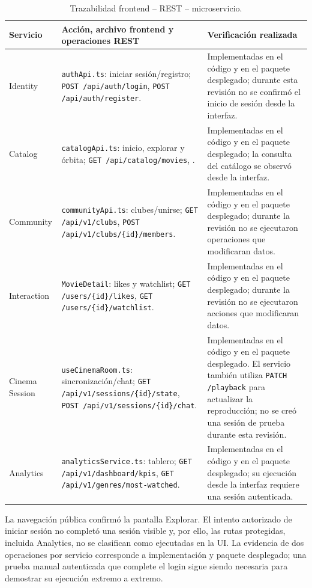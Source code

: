 \begin{table}[H]\centering\small\renewcommand{\arraystretch}{1.22}
\caption{Trazabilidad frontend -- REST -- microservicio.}\label{tab:frontend-servicios}
\begin{tabularx}{\textwidth}{p{}p{}Y}
\toprule Servicio & Acción, archivo frontend y operaciones REST & Verificación realizada \\\midrule
Identity & \texttt{authApi.ts}: iniciar sesión/registro; \texttt{POST /api/auth/login}, \texttt{POST /api/auth/register}. & Implementadas en el código y en el paquete desplegado; durante esta revisión no se confirmó el inicio de sesión desde la interfaz. \\
Catalog & \texttt{catalogApi.ts}: inicio, explorar y órbita; \texttt{GET /api/catalog/movies}, . & Implementadas en el código y en el paquete desplegado; la consulta del catálogo se observó desde la interfaz. \\
Community & \texttt{communityApi.ts}: clubes/unirse; \texttt{GET /api/v1/clubs}, \texttt{POST /api/v1/clubs/\{id\}/members}. & Implementadas en el código y en el paquete desplegado; durante la revisión no se ejecutaron operaciones que modificaran datos. \\
Interaction & \texttt{MovieDetail}: likes y watchlist; \texttt{GET /users/\{id\}/likes}, \texttt{GET /users/\{id\}/watchlist}. & Implementadas en el código y en el paquete desplegado; durante la revisión no se ejecutaron acciones que modificaran datos. \\
Cinema Session & \texttt{useCinemaRoom.ts}: sincronización/chat; \texttt{GET /api/v1/sessions/\{id\}/state}, \texttt{POST /api/v1/sessions/\{id\}/chat}. & Implementadas en el código y en el paquete desplegado. El servicio también utiliza \texttt{PATCH /playback} para actualizar la reproducción; no se creó una sesión de prueba durante esta revisión. \\
Analytics & \texttt{analyticsService.ts}: tablero; \texttt{GET /api/v1/dashboard/kpis}, \texttt{GET /api/v1/genres/most-watched}. & Implementadas en el código y en el paquete desplegado; su ejecución desde la interfaz requiere una sesión autenticada. \\
\bottomrule
\end{tabularx}
\end{table}

La navegación pública confirmó la pantalla Explorar. El intento autorizado de iniciar sesión no completó una sesión visible y, por ello, las rutas protegidas, incluida Analytics, no se clasifican como ejecutadas en la UI. La evidencia de dos operaciones por servicio corresponde a implementación y paquete desplegado; una prueba manual autenticada que complete el login sigue siendo necesaria para demostrar su ejecución extremo a extremo.
